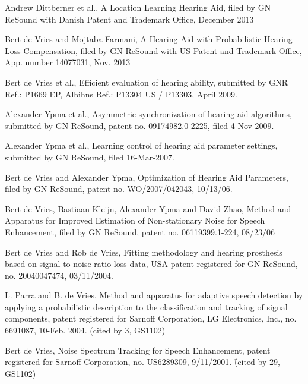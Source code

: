 \begin{etaremune}

\item Andrew Dittberner et al., A Location Learning Hearing Aid, filed by GN ReSound with Danish Patent and Trademark Office, December 2013

\item Bert de Vries and Mojtaba Farmani, A Hearing Aid with Probabilistic Hearing Loss Compensation, filed by GN ReSound with US Patent and Trademark Office, App. number 14077031, Nov. 2013 

\item Bert de Vries et al., Efficient evaluation of hearing ability, submitted by GNR Ref.: P1669 EP, Albihns Ref.: P13304 US / P13303, April 2009.

\item Alexander Ypma et al., Asymmetric synchronization of hearing aid algorithms, submitted by GN ReSound, patent no. 09174982.0-2225, filed 4-Nov-2009.

\item Alexander Ypma et al., Learning control of hearing aid parameter settings, submitted by GN ReSound, filed 16-Mar-2007.

\item Bert de Vries and Alexander Ypma, Optimization of Hearing Aid Parameters, filed by GN ReSound, patent no. WO/2007/042043, 10/13/06.

\item Bert de Vries, Bastiaan Kleijn, Alexander Ypma and David Zhao, Method and Apparatus for Improved Estimation of Non-stationary Noise for Speech Enhancement, filed by GN ReSound, patent no. 06119399.1-224, 08/23/06

\item Bert de Vries and Rob de Vries, Fitting methodology and hearing prosthesis based on signal-to-noise ratio loss data, USA patent registered for
GN ReSound, no. 20040047474, 03/11/2004.

\item L. Parra and B. de Vries, Method and apparatus for adaptive speech detection by applying a probabilistic description to the classification and tracking of signal components, patent registered for Sarnoff Corporation, LG Electronics, Inc., no. 6691087, 10-Feb. 2004. (cited by 3, GS1102)

\item Bert de Vries, Noise Spectrum Tracking for Speech Enhancement,
patent registered for Sarnoff Corporation, no. US6289309,
9/11/2001. \r{(cited by 29, GS1102)}


\end{etaremune}
